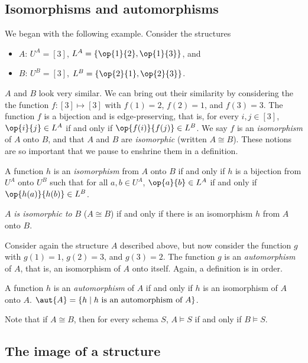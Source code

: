 \subsection{Isomorphisms and automorphisms}

We began with the following example. Consider the structures
\begin{itemize}
\item $A$: $U^A=[3]$, $L^A=\{\op{1}{2},\op{1}{3}\}$, and
\item $B$: $U^B=[3]$, $L^B=\{\op{2}{1},\op{2}{3}\}$.
\end{itemize}
$A$ and $B$ look very similar. We can bring out their similarity by considering the the function $f:[3]\mapsto[3]$ with $f(1)=2$, $f(2)=1$, and $f(3)=3$. The function $f$ is a bijection and is edge-preserving, that is, for every $i,j\in[3]$, $\op{i}{j}\in L^A$ if and only if $\op{f(i)}{f(j)}\in L^B$. We say $f$ is an \emph{isomorphism} of $A$ onto $B$, and that $A$ and $B$ are \emph{isomorphic} (written $A\cong B$). These notions are so important that we pause to enshrine them in a definition.
\begin{definition}
A function $h$ is an \emph{isomorphism} from $A$ onto $B$ if and only if $h$ is a bijection from $U^A$ onto $U^B$ such that for all $a,b\in U^A$, $\op{a}{b}\in L^A$ if and only if $\op{h(a)}{h(b)}\in L^B$.

$A$ \emph{is isomorphic to} $B$ ($A\cong B$) if and only if there is an isomorphism $h$ from $A$ onto $B$.
\end{definition}

Consider again the structure $A$ described above, but now consider the function $g$ with $g(1)=1$, $g(2)=3$, and $g(3)=2$. The function $g$ is an \emph{automorphism} of $A$, that is, an isomorphism of $A$ onto itself. Again, a definition is in order.
\begin{definition}
A function $h$ is an \emph{automorphism} of $A$  if and only if $h$ is an isomorphism of $A$ onto $A$. $\aut{A}=\{h\mid h\mbox{ is an automorphism of }A\}$.
\end{definition}

Note that if $A\cong B$, then for every schema $S$, $A\models S$ if and only if $B\models S$. 
\subsection{The image of a structure}

